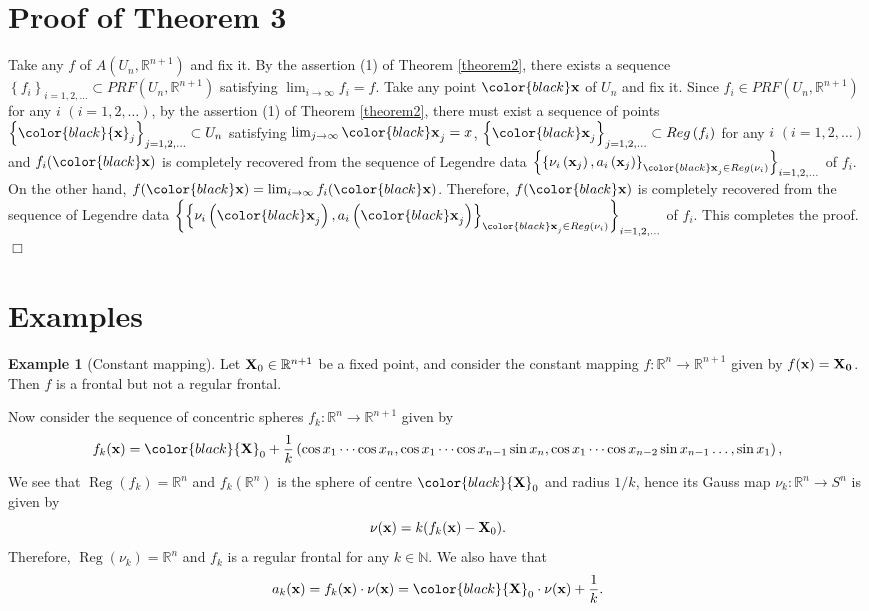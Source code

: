 \documentclass{amsart}
\theoremstyle{definition}
\theoremstyle{definition}
\newtheorem{example}{Example}
\theoremstyle{definition}
\newcommand{\R}{\mathbb{R}}
\DeclareMathOperator{\Reg}{Reg}
\newcommand{\ch}[1]{{\color{black} #1}}
\begin{document}
{{\section{Proof of Theorem 3}\label{section5}
Take any $f$ of $A\left(U_n, \mathbb{R}^{n+1}\right)$ and fix it.   
By the assertion (1) of Theorem \ref{theorem2}, there exists a 
sequence $\left\{f_i\right\}_{i=1, 2, \ldots}
\subset PRF\left(U_n, \mathbb{R}^{n+1}\right)$ satisfying 
$\lim_{i\to \infty}f_i=f$.     Take any point ${\color{black}\bf x}$ of $U_n$ and fix it.   
Since $f_i\in PRF\left(U_n, \mathbb{R}^{n+1}\right)$ for any 
$i$ $(i=1, 2, \ldots)$, 
by the assertion (1) of Theorem \ref{theorem2}, 
there must exist a sequence of points 
$\left\{\color{black}{\bf x}_j\right\}_{j=1, 2, \ldots}\subset U_n$ satisfying 
$\lim_{j\to \infty}{\color{black}\bf x}_j=x$, 
$\left\{{\color{black}\bf x}_j\right\}_{j=1, 2, \ldots}\subset Reg\left(f_i\right)$ for any 
$i$ $(i=1, 2, \ldots)$ and $f_i({\color{black}\bf x})$ is completely recovered 
from the sequence of Legendre data 
$\left\{\left\{\nu_i\left({\bf x}_j\right), a_i\left({\bf x}_j\right)
\right\}_{{\color{black}\bf x}_j\in Reg\left(\nu_i\right)}\right\}_{i=1, 2, \ldots}$ 
of $f_i$.    
On the other hand, $f({\color{black}\bf x})
=\lim_{i\to \infty}f_i({\color{black}\bf x})$.    Therefore, 
$f({\color{black}\bf x})$ is  completely recovered 
from the sequence of Legendre data 
$\left\{\left\{\nu_i\left({\color{black}\bf x}_j\right), 
a_i\left({\color{black}\bf x}_j\right)  
\right\}_{{\color{black}\bf x}_j\in Reg\left(\nu_i\right)}\right\}_{i=1, 2, \ldots}$ 
of $f_i$.      
This completes the proof.   
\hfill $\Box$
}
\section{Examples}\label{examples}


\begin{example}[Constant mapping]
	Let ${\bf X}_0 \in \R^{n+1}$ 
	{be a fixed point}, and consider the constant mapping 
	$f\colon \R^n \to \R^{n+1}$ given by $f({\bf x})
	={\bf X_0}$.
	Then $f$ is {a frontal but not a regular frontal}.

	Now consider the sequence of concentric spheres $f_k\colon \R^n \to \R^{n+1}$ given by
		\[f_k({\bf x})=\ch{{\bf X}_0}+\frac{1}{k}\left(\cos x_1 \cdots \cos x_n, \cos x_1 \cdots \cos x_{n-1} \sin x_n,  \cos x_1 \cdots \cos x_{n-2} \sin x_{n-1} \dots, \sin x_1\right),\]
	We see that $\Reg(f_{k})=\R^n$ and $f_k(\R^n)$ is the sphere of centre 
	$\ch{{\bf X}_0}$ and radius $1/k$, 
	hence its Gauss map $\nu_{k}\colon \R^n \to S^n$ is given by
		\[\nu({\bf x})=k(f_k({\bf x})-{\bf X}_0).\]
	Therefore, $\Reg(\nu_{k})=\R^n$ and $f_k$ is a regular frontal for any $k \in \mathbb{N}$.
	We also have that
		\[a_k({\bf x})=
		f_k({\bf x})\cdot \nu({\bf x})
		=\ch{{\bf X}_0}\cdot \nu({\bf x})+\frac{1}{k}.\]
	

\end{example}}
\end{document}
